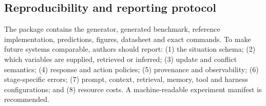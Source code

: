\documentclass[Numbered]{sn-jnl}
\begin{document}
\subsection*{Reproducibility and reporting protocol}

The package contains the generator, generated benchmark, reference
implementation, predictions, figures, datasheet and exact commands. To make
future systems comparable, authors should report: (1) the situation schema;
(2) which variables are supplied, retrieved or inferred; (3) update and conflict
semantics; (4) response and action policies; (5) provenance and observability;
(6) stage-specific errors; (7) prompt, context, retrieval, memory, tool and
harness configurations; and (8) resource costs. A machine-readable experiment
manifest is recommended.
\end{document}

